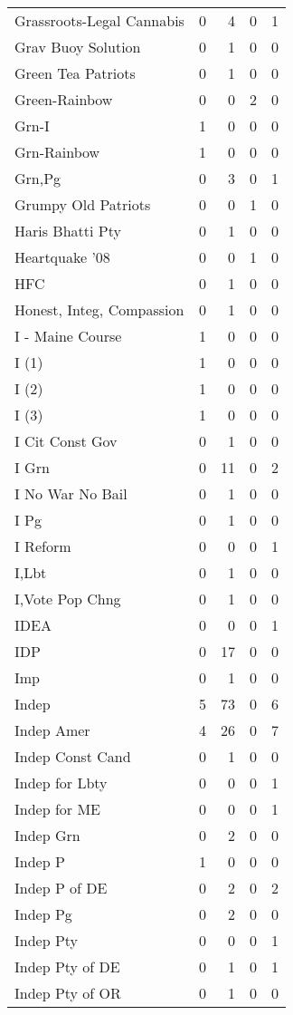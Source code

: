 \begin{supertabular}{lrrrr}
Grassroots-Legal Cannabis & 0 & 4 & 0 & 1\\
Grav Buoy Solution & 0 & 1 & 0 & 0\\
Green Tea Patriots & 0 & 1 & 0 & 0\\
Green-Rainbow & 0 & 0 & 2 & 0\\
Grn-I & 1 & 0 & 0 & 0\\
Grn-Rainbow & 1 & 0 & 0 & 0\\
Grn,Pg & 0 & 3 & 0 & 1\\
Grumpy Old Patriots & 0 & 0 & 1 & 0\\
Haris Bhatti Pty & 0 & 1 & 0 & 0\\
Heartquake '08 & 0 & 0 & 1 & 0\\
HFC & 0 & 1 & 0 & 0\\
Honest, Integ, Compassion & 0 & 1 & 0 & 0\\
I - Maine Course & 1 & 0 & 0 & 0\\
I (1) & 1 & 0 & 0 & 0\\
I (2) & 1 & 0 & 0 & 0\\
I (3) & 1 & 0 & 0 & 0\\
I Cit Const Gov & 0 & 1 & 0 & 0\\
I Grn & 0 & 11 & 0 & 2\\
I No War No Bail & 0 & 1 & 0 & 0\\
I Pg & 0 & 1 & 0 & 0\\
I Reform & 0 & 0 & 0 & 1\\
I,Lbt & 0 & 1 & 0 & 0\\
I,Vote Pop Chng & 0 & 1 & 0 & 0\\
IDEA & 0 & 0 & 0 & 1\\
IDP & 0 & 17 & 0 & 0\\
Imp & 0 & 1 & 0 & 0\\
Indep & 5 & 73 & 0 & 6\\
Indep Amer & 4 & 26 & 0 & 7\\
Indep Const Cand & 0 & 1 & 0 & 0\\
Indep for Lbty & 0 & 0 & 0 & 1\\
Indep for ME & 0 & 0 & 0 & 1\\
Indep Grn & 0 & 2 & 0 & 0\\
Indep P & 1 & 0 & 0 & 0\\
Indep P of DE & 0 & 2 & 0 & 2\\
Indep Pg & 0 & 2 & 0 & 0\\
Indep Pty & 0 & 0 & 0 & 1\\
Indep Pty of DE & 0 & 1 & 0 & 1\\
Indep Pty of OR & 0 & 1 & 0 & 0\\

\end{supertabular}
